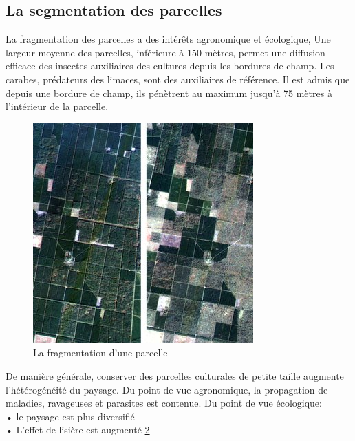 \documentclass[12pt, openany]{report}
\begin{document}
\subsection{La segmentation des parcelles}
La fragmentation des parcelles a des intérêts agronomique et écologique, Une largeur moyenne des parcelles, inférieure à 150 mètres, permet une diffusion efficace des insectes auxiliaires des cultures depuis les bordures de champ.
Les carabes, prédateurs des limaces, sont des auxiliaires de référence. Il est admis que depuis une bordure de champ, ils pénètrent au maximum jusqu’à 75 mètres à l’intérieur de la parcelle.
\begin{figure}[hp]
\centering
\includegraphics[scale=1]{seg.jpg}
\caption{La fragmentation d'une parcelle}
\end{figure}
De manière générale, conserver des parcelles culturales de petite taille augmente l'hétérogénéité du paysage.
Du point de vue agronomique, la propagation de maladies, ravageuses et parasites est contenue.
Du point de vue écologique:\\
•	le paysage est plus diversifié\\
•	L’effet de lisière est augmenté \hyperref[sec:refs]{2}
\end{document}
